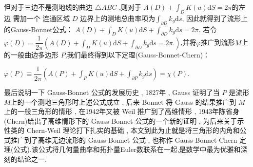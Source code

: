 \documentclass[main]{subfiles}
\begin{document}
但对于三边不是测地线的曲边 $\triangle ABC$ ,则对于 $A(D)+\displaystyle\int_{D}K(u)\mathrm{d}S=2\pi$的左边
需加一个 连通区域 $D$ 边界上的测地总曲率项为$\displaystyle\int_{\partial D}k_{g}\mathrm{d}s$,
因此就得到了流形上的Gauss-Bonnet公式：
$
	A(D)+\displaystyle\int_{D}K(u)\mathrm{d}S+\displaystyle\int_{\partial D}k_{g}\mathrm{d}s=2\pi.
$
若令$\varphi (D)=\dfrac{1}{2\pi }\left(  A(D)+\displaystyle\int_{D}K(u)\mathrm{d}S+\displaystyle\int_{\partial D}k_{g}\mathrm{d}s=2\pi. \right)$,并将$\varphi$推广到流形$M$上的一般曲边多边形
$P$,我们最终得到以下定理(Gauss-Bonnet-Chern)：
\begin{theorem}
	$\varphi (P)\equiv \dfrac{1}{2\pi }\left(  A(P)+\displaystyle\int_{P}K(u)\mathrm{d}S+\displaystyle\int_{\partial P}k_{g}\mathrm{d}s\right)=\chi (P). $
\end{theorem}
最后说明一下 Gauss-Bonnet 公式的发展历史 , 1827年 , Gauss
证明了当 $P$ 是流形 $M$上的一个测地三角形时上述公式成立 ,
后来 Bonnet 将 Gauss 的结果推广到 $M$ 上的一般三角形的情形 ,
在1942年又被 Weil 推广到了高维情形 , 1943年陈省身(Chern)给出了高维情形下的
Gauss-Bonnet 公式的一个新的证明 , 为后来关于示性类的 Chern-Weil 理论打下扎实的基础 ,
本文到此为止就是将三角形的内角和公式推广到了高维无边流形的 Gauss-Bonnet 公式 ,
也称作 Gauss-Bonnet-Chern 定理(公式).该公式将几何量曲率和拓扑量Euler数联系在一起,是数学中最为优雅和深刻的结论之一.
\end{document}
